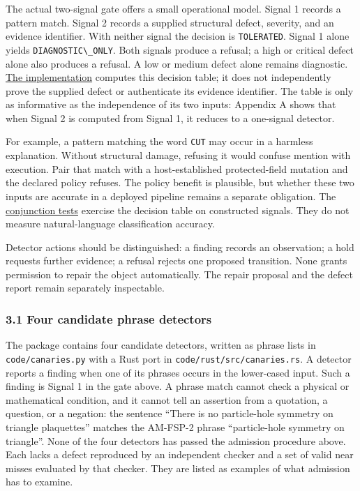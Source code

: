 \documentclass[
  11pt,
]{article}
\newcommand{\passthrough}[1]{#1}
\begin{document}
The actual two-signal gate offers a small operational model. Signal 1
records a pattern match. Signal 2 records a supplied structural defect,
severity, and an evidence identifier. With neither signal the decision
is \passthrough{\lstinline!TOLERATED!}. Signal 1 alone yields
\passthrough{\lstinline!DIAGNOSTIC\_ONLY!}. Both signals produce a
refusal; a high or critical defect alone also produces a refusal. A low
or medium defect alone remains diagnostic.
\href{https://github.com/dbccpage/the_symbol_game/blob/52cb5457f6c485ba548cfd292f6012a941ed22cf/symbol_game/domain/immune/danger_gate.py}{The
implementation} computes this decision table; it does not independently
prove the supplied defect or authenticate its evidence identifier. The
table is only as informative as the independence of its two inputs:
Appendix A shows that when Signal 2 is computed from Signal 1, it
reduces to a one-signal detector.

For example, a pattern matching the word \passthrough{\lstinline!CUT!}
may occur in a harmless explanation. Without structural damage, refusing
it would confuse mention with execution. Pair that match with a
host-established protected-field mutation and the declared policy
refuses. The policy benefit is plausible, but whether these two inputs
are accurate in a deployed pipeline remains a separate obligation. The
\href{https://github.com/dbccpage/the_symbol_game/blob/52cb5457f6c485ba548cfd292f6012a941ed22cf/symbol_game/tests/mssn_sn_demos/test_demo_immune_strict.py}{conjunction
tests} exercise the decision table on constructed signals. They do not
measure natural-language classification accuracy.

Detector actions should be distinguished: a finding records an
observation; a hold requests further evidence; a refusal rejects one
proposed transition. None grants permission to repair the object
automatically. The repair proposal and the defect report remain
separately inspectable.

\subsubsection{3.1 Four candidate phrase
detectors}\label{four-candidate-phrase-detectors}

The package contains four candidate detectors, written as phrase lists
in \passthrough{\lstinline!code/canaries.py!} with a Rust port in
\nolinkurl{code/rust/src/canaries.rs}. A detector reports a finding when
one of its phrases occurs in the lower-cased input. Such a finding is
Signal 1 in the gate above. A phrase match cannot check a physical or
mathematical condition, and it cannot tell an assertion from a
quotation, a question, or a negation: the sentence ``There is no
particle-hole symmetry on triangle plaquettes'' matches the AM-FSP-2
phrase ``particle-hole symmetry on triangle''. None of the four
detectors has passed the admission procedure above. Each lacks a defect
reproduced by an independent checker and a set of valid near misses
evaluated by that checker. They are listed as examples of what admission
has to examine.
\end{document}
